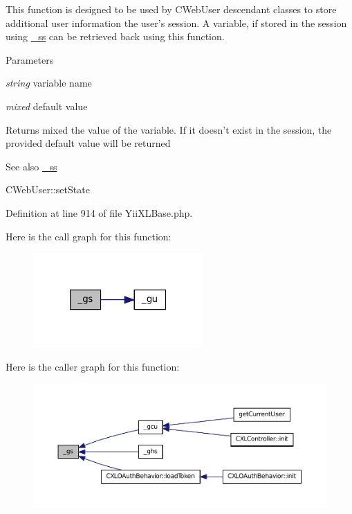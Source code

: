 This function is designed to be used by CWebUser descendant classes to store additional user information the user's session. A variable, if stored in the session using \hyperlink{}{\_\-ss} can be retrieved back using this function.


\begin{DoxyParams}{Parameters}
\item[{\em string}]variable name \item[{\em mixed}]default value \end{DoxyParams}
\begin{DoxyReturn}{Returns}
mixed the value of the variable. If it doesn't exist in the session, the provided default value will be returned 
\end{DoxyReturn}
\begin{DoxySeeAlso}{See also}
\hyperlink{classYiiXLBase_aa5c4459afda5a8a58c46a26aecafaf37}{\_\-ss} 

CWebUser::setState 
\end{DoxySeeAlso}


Definition at line 914 of file YiiXLBase.php.








Here is the call graph for this function:\nopagebreak
\begin{figure}[H]
\begin{center}
\leavevmode
\includegraphics[width=184pt]{classYiiXLBase_adeaa7024db6a25cc45abc37c388661d3_cgraph}
\end{center}
\end{figure}




Here is the caller graph for this function:\nopagebreak
\begin{figure}[H]
\begin{center}
\leavevmode
\includegraphics[width=400pt]{classYiiXLBase_adeaa7024db6a25cc45abc37c388661d3_icgraph}
\end{center}
\end{figure}


